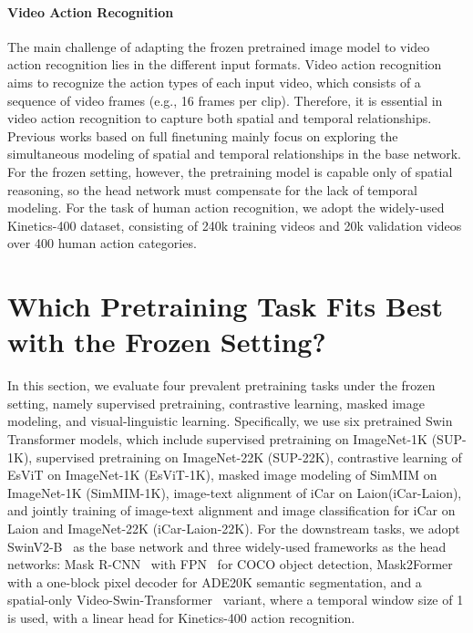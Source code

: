 \documentclass{article}
\begin{document}
\paragraph{Video Action Recognition} The main challenge of adapting the frozen pretrained image model to video action recognition lies in the different input formats. Video action recognition aims to recognize the action types of each input video, which consists of a sequence of video frames (e.g., 16 frames per clip). Therefore, it is essential in video action recognition to capture both spatial and temporal relationships. Previous works based on full finetuning mainly focus on exploring the simultaneous modeling of spatial and temporal relationships in the base network. For the frozen setting, however, the pretraining model is capable only of spatial reasoning, so the head network must compensate for the lack of temporal modeling. For the task of human action recognition, we adopt the widely-used Kinetics-400 \cite{kay2017kinetics} dataset, consisting of 240k training videos and 20k validation videos over 400 human action categories. 

\section{Which Pretraining Task Fits Best with the Frozen Setting?}
\label{sec:which_task_fit}

In this section, we evaluate four prevalent pretraining tasks under the frozen setting, namely supervised pretraining, contrastive learning, masked image modeling, and visual-linguistic learning. Specifically, we use six pretrained Swin Transformer models, which include supervised pretraining on ImageNet-1K (SUP-1K), supervised pretraining on ImageNet-22K (SUP-22K), contrastive learning of EsViT on ImageNet-1K (EsViT-1K), masked image modeling of SimMIM on ImageNet-1K (SimMIM-1K), image-text alignment of iCar on Laion\cite{schuhmann2021laion}(iCar-Laion), and jointly training of image-text alignment and image classification for iCar on Laion and ImageNet-22K (iCar-Laion-22K). For the downstream tasks, we adopt SwinV2-B~\cite{swinv2} as the base network and three widely-used frameworks as the head networks: Mask R-CNN~\cite{Mask-rcnn} with FPN~\cite{FPN} for COCO object detection, Mask2Former~\cite{mask2former} with a one-block pixel decoder for ADE20K semantic segmentation, and a 
spatial-only Video-Swin-Transformer~\cite{liu2021video} variant, where a temporal window size of 1 is used, with a linear head for Kinetics-400 action recognition.
\end{document}
